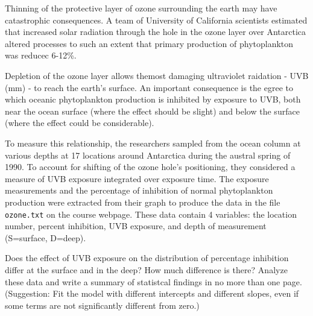 \documentclass{homework}
\begin{document}
\begin{longproblem}
Thinning of the protective layer of ozone surrounding the earth may have catastrophic consequences.   A team of University of California scientists estimated that increased solar radiation through the hole in the ozone layer over Antarctica altered processes to such an extent that primary production of phytoplankton was reducec 6-12\%.

Depletion of the ozone layer allows themost damaging ultraviolet raidation - UVB (\unit[280-320]{mm}) - to reach the earth's surface.  An important consequence is the egree to which oceanic phytoplankton production is inhibited by exposure to UVB, both near the ocean surface (where the effect should be slight) and below the surface (where the effect could be considerable).

To measure this relationship, the researchers sampled from the ocean column at various depths at 17 locations around Antarctica during the austral spring of 1990.  To account for shifting of the ozone hole's positioning, they considered a measure of UVB exposure integrated over exposure time.  The exposure measurements and the percentage of inhibition of normal phytoplankton production were extracted from their graph to produce the data in the file \texttt{ozone.txt} on the course webpage.  These data contain 4 variables: the location number, percent inhibition, UVB exposure, and depth of measurement (S=surface, D=deep).

Does the effect of UVB exposure on the distribution of percentage inhibition differ at the surface and in the deep?  How much difference is there?  Analyze these data and write a summary of statistcal findings in no more than one page.  (Suggestion: Fit the model with different intercepts and different slopes, even if some terms are not significantly different from zero.)
\end{longproblem}
\end{document}
